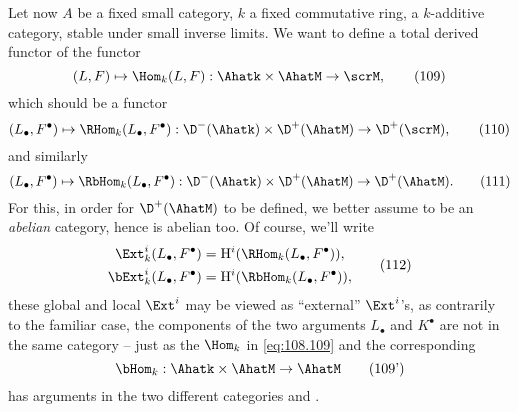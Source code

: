 Let now $A$ be a fixed small category, $k$ a fixed commutative ring,
\scrM{} a $k$-additive category, stable under small inverse limits. We
want to define a total derived functor of the functor
\begin{equation}
  \label{eq:108.109}
  (L,F)\mapsto \Hom_k(L,F):\Ahatk \times \AhatM\to\scrM,\tag{109}
\end{equation}
which should be a functor
\begin{equation}
  \label{eq:108.110}
  (L_\bullet,F^\bullet)\mapsto \RHom_k(L_\bullet,F^\bullet) :
  \D^-(\Ahatk)\times \D^+(\AhatM) \to \D^+(\scrM),\tag{110}
\end{equation}
and similarly
\begin{equation}
  \label{eq:108.111}
  (L_\bullet,F^\bullet)\mapsto\RbHom_k(L_\bullet,F^\bullet) :
  \D^-(\Ahatk) \times \D^+(\AhatM) \to \D^+(\AhatM).\tag{111}
\end{equation}
For this, in order for $\D^+(\AhatM)$ to be defined, we better assume
\scrM{} to be an \emph{abelian} category, hence \AhatM{} is abelian
too. Of course, we'll write
\begin{equation}
  \label{eq:108.112}
  \begin{aligned}
    \Ext_k^i(L_\bullet,F^\bullet) &=
    \mathrm H^i(\RHom_k(L_\bullet,F^\bullet)), \\
    \bExt_k^i(L_\bullet,F^\bullet) &=
    \mathrm H^i(\RbHom_k(L_\bullet,F^\bullet)),
  \end{aligned}\tag{112}
\end{equation}
these global and local $\Ext^i$ may be viewed as ``external''
$\Ext^i$'s, as contrarily to the familiar case, the components of the
two arguments $L_\bullet$ and $K^\bullet$ are not in the same category
-- just as the $\Hom_k$ in \eqref{eq:108.109} and the corresponding
\begin{equation}
  \label{eq:108.109prime}
  \bHom_k:\Ahatk\times\AhatM\to\AhatM\tag{109'}
\end{equation}
has arguments in the two different categories \Ahatk{} and \AhatM.

